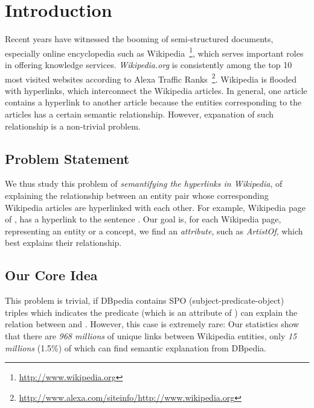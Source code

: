 \section{Introduction}

Recent years have witnessed the booming of semi-structured documents, especially online encyclopedia such as  Wikipedia~\footnote{\small\url{http://www.wikipedia.org}}, which serves important roles in offering knowledge services.
{\it Wikipedia.org} is consistently among the top 10 most visited websites according to Alexa Traffic Ranks~\footnote{\small\url{http://www.alexa.com/siteinfo/http://www.wikipedia.org}}.
Wikipedia is flooded with hyperlinks, which interconnect the Wikipedia articles.
In general, one article contains a hyperlink to another article because the entities corresponding to the articles has a certain semantic relationship.
However, expanation of such relationship is a non-trivial problem.

\subsection{Problem Statement}
We thus study this problem of
{\it semantifying the hyperlinks in Wikipedia}, of 
explaining the relationship between an entity pair whose corresponding Wikipedia articles are hyperlinked with each other.
For example,
 Wikipedia page of , has a hyperlink to  the sentence .
Our goal is, for each Wikipedia page, representing an entity or a concept,
we find an \emph{attribute}, such as \emph{ArtistOf}, which best explains their relationship.


\subsection{Our Core Idea}

This problem is trivial, if DBpedia contains 
SPO (subject-predicate-object) triples  which indicates the predicate  (which is an attribute of ) can explain the relation between  and .
However, this case is extremely rare:
Our statistics show that there are \emph{968 millions} of unique links between Wikipedia entities, only \emph{15 millions} (1.5\%) of which can find semantic explanation from DBpedia.

